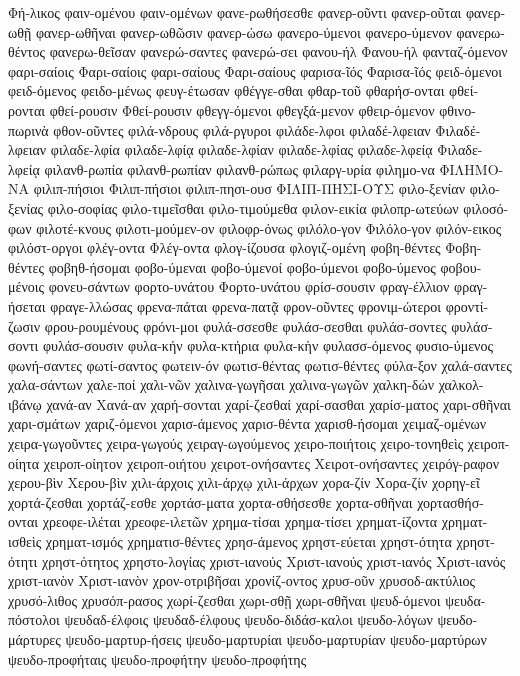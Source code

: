 {Φή-λικος
φαιν-ομένου
φαιν-ομένων
φανε-ρωθήσεσθε
φανερ-οῦντι
φανερ-οῦται
φανερ-ωθῇ
φανερ-ωθῆναι
φανερ-ωθῶσιν
φανερ-ώσω
φανερο-ύμενοι
φανερο-ύμενον
φανερω-θέντος
φανερω-θεῖσαν
φανερώ-σαντες
φανερώ-σει
φανου-ήλ
Φανου-ήλ
φανταζ-όμενον
φαρι-σαίοις
Φαρι-σαίοις
φαρι-σαίους
Φαρι-σαίους
φαρισα-ῖός
Φαρισα-ῖός
φειδ-όμενοι
φειδ-όμενος
φειδο-μένως
φευγ-έτωσαν
φθέγγε-σθαι
φθαρ-τοῦ
φθαρήσ-ονται
φθεί-ρονται
φθεί-ρουσιν
Φθεί-ρουσιν
φθεγγ-όμενοι
φθεγξά-μενον
φθειρ-όμενον
φθινο-πωρινὰ
φθον-οῦντες
φιλά-νδρους
φιλά-ργυροι
φιλάδε-λφοι
φιλαδέ-λφειαν
Φιλαδέ-λφειαν
φιλαδε-λφία
φιλαδε-λφίᾳ
φιλαδε-λφίαν
φιλαδε-λφίας
φιλαδε-λφείᾳ
Φιλαδε-λφείᾳ
φιλανθ-ρωπία
φιλανθ-ρωπίαν
φιλανθ-ρώπως
φιλαργ-υρία
φιλημο-να
ΦΙΛΗΜΟ-ΝΑ
φιλιπ-πήσιοι
Φιλιπ-πήσιοι
φιλιπ-πησι-ουσ
ΦΙΛΙΠ-ΠΗΣΙ-ΟΥΣ
φιλο-ξενίαν
φιλο-ξενίας
φιλο-σοφίας
φιλο-τιμεῖσθαι
φιλο-τιμούμεθα
φιλον-εικία
φιλοπρ-ωτεύων
φιλοσό-φων
φιλοτέ-κνους
φιλοτι-μούμεν-ον
φιλοφρ-όνως
φιλόλο-γον
Φιλόλο-γον
φιλόν-εικος
φιλόστ-οργοι
φλέγ-οντα
Φλέγ-οντα
φλογ-ίζουσα
φλογιζ-ομένη
φοβη-θέντες
Φοβη-θέντες
φοβηθ-ήσομαι
φοβο-ύμεναι
φοβο-ύμενοί
φοβο-ύμενοι
φοβο-ύμενος
φοβου-μένοις
φονευ-σάντων
φορτο-υνάτου
Φορτο-υνάτου
φρίσ-σουσιν
φραγ-έλλιον
φραγ-ήσεται
φραγε-λλώσας
φρενα-πάται
φρενα-πατᾷ
φρον-οῦντες
φρονιμ-ώτεροι
φροντί-ζωσιν
φρου-ρουμένους
φρόνι-μοι
φυλά-σσεσθε
φυλάσ-σεσθαι
φυλάσ-σοντες
φυλάσ-σοντι
φυλάσ-σουσιν
φυλα-κήν
φυλα-κτήρια
φυλα-κὴν
φυλασσ-όμενος
φυσιο-ύμενος
φωνή-σαντες
φωτί-σαντος
φωτειν-όν
φωτισ-θέντας
φωτισ-θέντες
φύλα-ξον
χαλά-σαντες
χαλα-σάντων
χαλε-ποί
χαλι-νῶν
χαλινα-γωγῆσαι
χαλινα-γωγῶν
χαλκη-δών
χαλκολ-ιβάνῳ
χανά-αν
Χανά-αν
χαρή-σονται
χαρί-ζεσθαί
χαρί-σασθαι
χαρίσ-ματος
χαρι-σθῆναι
χαρι-σμάτων
χαριζ-όμενοι
χαρισ-άμενος
χαρισ-θέντα
χαρισθ-ήσομαι
χειμαζ-ομένων
χειρα-γωγοῦντες
χειρα-γωγούς
χειραγ-ωγούμενος
χειρο-ποιήτοις
χειρο-τονηθεὶς
χειροπ-οίητα
χειροπ-οίητον
χειροπ-οιήτου
χειροτ-ονήσαντες
Χειροτ-ονήσαντες
χειρόγ-ραφον
χερου-βὶν
Χερου-βὶν
χιλι-άρχοις
χιλι-άρχῳ
χιλι-άρχων
χορα-ζίν
Χορα-ζίν
χορηγ-εῖ
χορτά-ζεσθαι
χορτάζ-εσθε
χορτάσ-ματα
χορτα-σθήσεσθε
χορτα-σθῆναι
χορτασθήσ-ονται
χρεοφε-ιλέται
χρεοφε-ιλετῶν
χρημα-τίσαι
χρημα-τίσει
χρηματ-ίζοντα
χρηματ-ισθεὶς
χρηματ-ισμός
χρηματισ-θέντες
χρησ-άμενος
χρηστ-εύεται
χρηστ-ότητα
χρηστ-ότητι
χρηστ-ότητος
χρηστο-λογίας
χριστ-ιανούς
Χριστ-ιανούς
χριστ-ιανός
Χριστ-ιανός
χριστ-ιανὸν
Χριστ-ιανὸν
χρον-οτριβῆσαι
χρονίζ-οντος
χρυσ-οῦν
χρυσοδ-ακτύλιος
χρυσό-λιθος
χρυσόπ-ρασος
χωρί-ζεσθαι
χωρι-σθῇ
χωρι-σθῆναι
ψευδ-όμενοι
ψευδα-πόστολοι
ψευδαδ-έλφοις
ψευδαδ-έλφους
ψευδο-διδάσ-καλοι
ψευδο-λόγων
ψευδο-μάρτυρες
ψευδο-μαρτυρ-ήσεις
ψευδο-μαρτυρίαι
ψευδο-μαρτυρίαν
ψευδο-μαρτύρων
ψευδο-προφήταις
ψευδο-προφήτην
ψευδο-προφήτης
}
